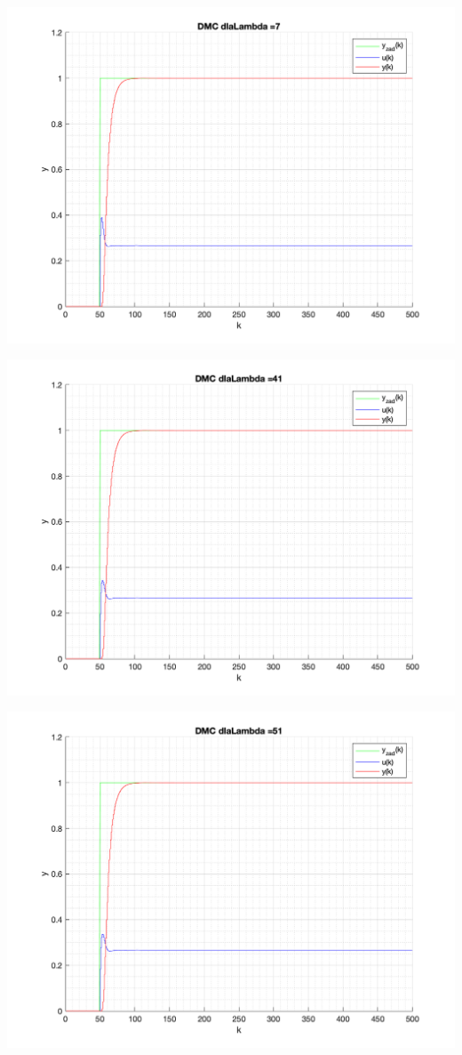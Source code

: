 \documentclass[a4paper, 11pt]{article}
\begin{document}
\begin{enumerate}
 \includegraphics[width=\linewidth]{./ModelsP4_Lambda/P4_DMC_Lambda_7_png.png} 
 
 \includegraphics[width=\linewidth]{./ModelsP4_Lambda/P4_DMC_Lambda_41_png.png} 
 
 \includegraphics[width=\linewidth]{./ModelsP4_Lambda/P4_DMC_Lambda_51_png.png} 
 

\end{enumerate}
\end{document}
